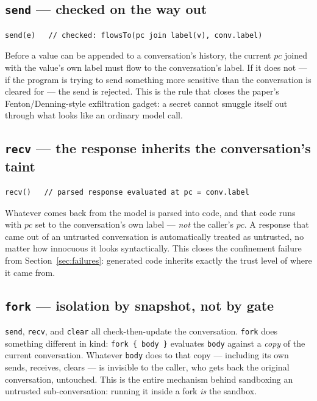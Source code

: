 \documentclass[11pt, a4paper]{article}
\begin{document}
\subsection{\texttt{send} --- checked on the way out}

\begin{lstlisting}
send(e)   // checked: flowsTo(pc join label(v), conv.label)
\end{lstlisting}

Before a value can be appended to a conversation's history, the current
$pc$ joined with the value's own label must flow to the conversation's
label. If it does not --- if the program is trying to send something more
sensitive than the conversation is cleared for --- the send is rejected.
This is the rule that closes the paper's Fenton/Denning-style
exfiltration gadget: a secret cannot smuggle itself out through what looks
like an ordinary model call.

\subsection{\texttt{recv} --- the response inherits the conversation's taint}

\begin{lstlisting}
recv()   // parsed response evaluated at pc = conv.label
\end{lstlisting}

Whatever comes back from the model is parsed into code, and that code
runs with $pc$ set to the conversation's own label --- \emph{not} the
caller's $pc$. A response that came out of an untrusted conversation is
automatically treated as untrusted, no matter how innocuous it looks
syntactically. This closes the confinement failure from
Section~\ref{sec:failures}: generated code inherits exactly the trust
level of where it came from.

\subsection{\texttt{fork} --- isolation by snapshot, not by gate}

\lstinline{send}, \lstinline{recv}, and \lstinline{clear} all check-then-update the
conversation. \lstinline{fork} does something different in kind:
\lstinline|fork { body }| evaluates \lstinline{body} against a \emph{copy}
of the current conversation. Whatever \lstinline{body} does to that copy
--- including its own sends, receives, clears --- is invisible to the
caller, who gets back the original conversation, untouched. This is the
entire mechanism behind sandboxing an untrusted sub-conversation: running
it inside a fork \emph{is} the sandbox.
\end{document}
